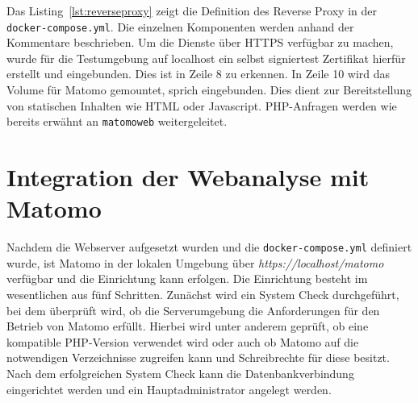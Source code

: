 Das Listing~\ref{lst:reverseproxy} zeigt die Definition des Reverse Proxy in der \texttt{docker-compose.yml}. Die einzelnen Komponenten werden anhand der Kommentare beschrieben. Um die Dienste über HTTPS verfügbar zu machen, wurde für die Testumgebung auf localhost ein selbst signiertest Zertifikat hierfür erstellt und eingebunden. Dies ist in Zeile 8 zu erkennen. In Zeile 10 wird das Volume für Matomo gemountet, sprich eingebunden. Dies dient zur Bereitstellung von statischen Inhalten wie HTML oder Javascript. PHP-Anfragen werden wie bereits erwähnt an \texttt{matomo\textunderscore web} weitergeleitet.

\section{Integration der Webanalyse mit Matomo}
Nachdem die Webserver aufgesetzt wurden und die \texttt{docker-compose.yml} definiert wurde, ist Matomo in der lokalen Umgebung über \textit{https://localhost/matomo} verfügbar und die Einrichtung kann erfolgen. Die Einrichtung besteht im wesentlichen aus fünf Schritten. Zunächst wird ein System Check durchgeführt, bei dem überprüft wird, ob die Serverumgebung die Anforderungen für den Betrieb von Matomo erfüllt. Hierbei wird unter anderem geprüft, ob eine kompatible PHP-Version verwendet wird oder auch ob Matomo auf die notwendigen Verzeichnisse zugreifen kann und Schreibrechte für diese besitzt. Nach dem erfolgreichen System Check kann die Datenbankverbindung eingerichtet werden und ein Hauptadministrator angelegt werden. 

